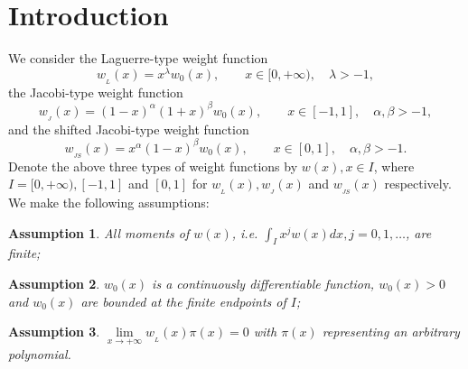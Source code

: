 \documentclass[12pt,a4paper]{article}    %
\newtheorem{assumption}{Assumption}
\numberwithin{equation}{section}
\begin{document}
\section{Introduction}\label{section1}
We consider the Laguerre-type weight function
\begin{equation}\label{wL}
	w_{_L}(x)=x^\lambda w_0(x),\qquad x\in [0, +\infty),\quad\lambda>-1,
\end{equation}
the Jacobi-type weight function
\begin{equation}\label{wJ}
w_{_J}(x)=(1-x)^{\alpha}(1+x)^{\beta}w_0(x),\qquad x\in[-1,1],\quad\alpha,\beta>-1,
\end{equation}
and the shifted Jacobi-type weight function
\begin{equation}\label{wJS}
w_{_{JS}}(x)=x^{\alpha}(1-x)^{\beta}w_0(x),\qquad x\in[0,1],\quad\alpha,\beta>-1.
\end{equation}
Denote the above three types of weight functions by $w(x),x\in I$, where $I=[0,+\infty),[-1,1]$ and $[0,1]$ for $w_{_L}(x),w_{_J}(x)$ and $w_{_{JS}}(x)$ respectively. We make the following assumptions:
\begin{assumption}\label{ass:moments}
All moments of $w(x)$,  i.e. $\int_Ix^jw(x)dx,j=0,1,\ldots$, are finite;
\end{assumption}
\begin{assumption}\label{ass:w0}
$w_0(x)$ is a continuously differentiable function, $w_0(x)>0$ and $w_0(x)$ are bounded at the finite endpoints of $I$;
\end{assumption}
\begin{assumption}\label{ass:wL}
$\lim\limits_{x\to +\infty}w_{_L}(x)\pi(x)=0$ with $\pi(x)$ representing an arbitrary polynomial.
\end{assumption}
\end{document}
